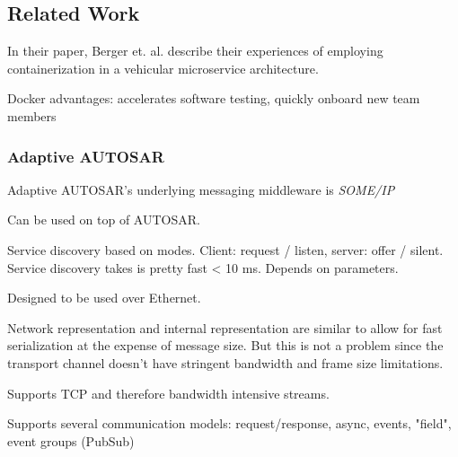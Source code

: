 

\subsection{Related Work}

In their paper, Berger et. al. \cite{berger2017containerized} describe their experiences of employing containerization in a vehicular microservice architecture. 

Docker advantages: accelerates software testing, quickly onboard new team members


\subsubsection{Adaptive AUTOSAR}

Adaptive AUTOSAR's underlying messaging middleware is \emph{SOME/IP}

Can be used on top of AUTOSAR.

Service discovery based on modes. Client: request / listen, server: offer / silent.
Service discovery takes is pretty fast < 10 ms. Depends on parameters.

Designed to be used over Ethernet.

Network representation and internal representation are similar to allow for fast serialization at the expense of message size. But this is not a problem since the transport channel doesn't have stringent bandwidth and frame size limitations.

Supports TCP and therefore bandwidth intensive streams.

Supports several communication models: request/response, async, events, "field", event groups (PubSub)